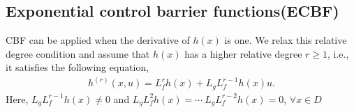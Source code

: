 \subsection{Exponential control barrier functions(ECBF)}
\label{sec:ECBF}
CBF can be applied when the derivative of $ h(x) $ is one.
We relax this relative degree condition and assume that $ h(x) $ has a higher relative degree $ r \geq 1 $, i.e., it satisfies the following equation,
\begin{align}
    \label{eq:h_relative_degree}
    h^{(r)}(x,u) = L_f^r h(x) + L_g L_f^{r-1} h(x)u.
\end{align}
Here, $L_g L_f^{r-1} h(x) \neq 0 $ and $ L_g L_f^2 h(x) = \cdots ~ L_g L_f^{r-2} h(x) = 0 $, $ \forall x \in D $
